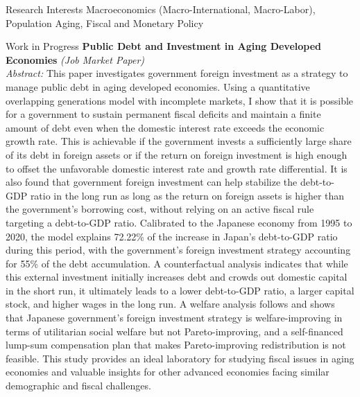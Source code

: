 \documentclass{cv} %
\begin{document}
\begin{rSection}{Research Interests}
Macroeconomics (Macro-International, Macro-Labor), Population Aging, Fiscal and Monetary Policy
\end{rSection}
\bigskip
\begin{rSection}{Work in Progress}
\medskip
{\bf Public Debt and Investment in Aging Developed Economies} \emph{(Job Market Paper)} \\
\begin{adjustbox}{minipage=0.95\textwidth, right}
	\vspace{0.3em} {\emph{Abstract:} This paper investigates government foreign investment as a strategy to manage public debt in aging developed economies. Using a quantitative overlapping generations model with incomplete markets, I show that it is possible for a government to sustain permanent fiscal deficits and maintain a finite amount of debt even when the domestic interest rate exceeds the economic growth rate. This is achievable if the government invests a sufficiently large share of its debt in foreign assets or if the return on foreign investment is high enough to offset the unfavorable domestic interest rate and growth rate differential. It is also found that government foreign investment can help stabilize the debt-to-GDP ratio in the long run as long as the return on foreign assets is higher than the government's borrowing cost, without relying on an active fiscal rule targeting a debt-to-GDP ratio. Calibrated to the Japanese economy from 1995 to 2020, the model explains 72.22\% of the increase in Japan's debt-to-GDP ratio during this period, with the government's foreign investment strategy accounting for 55\% of the debt accumulation. A counterfactual analysis indicates that while this external investment initially increases debt and crowds out domestic capital in the short run, it ultimately leads to a lower debt-to-GDP ratio, a larger capital stock, and higher wages in the long run. A welfare analysis follows and shows that Japanese government's foreign investment strategy is welfare-improving in terms of utilitarian social welfare but not Pareto-improving, and a self-financed lump-sum compensation plan that makes Pareto-improving redistribution is not feasible. This study provides an ideal laboratory for studying fiscal issues in aging economies and valuable insights for other advanced economies facing similar demographic and fiscal challenges.}
\end{adjustbox}


\end{rSection}
\end{document}
